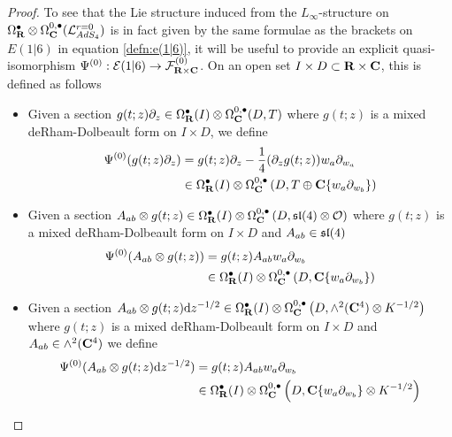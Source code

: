 \documentclass[../main.tex]{subfiles}
\begin{document}
\begin{proof}
To see that the Lie structure induced from the $L_\infty$-structure on $\Omega^\bullet_{\mathbf{R}}\otimes \Omega^{0,\bullet}_{\mathbf{C}} (\mathcal{L}^{r=0}_{AdS_4} )$ is in fact given by the same formulae as the brackets on $E(1|6)$ in equation \ref{defn:e(1|6)}, it will be useful to provide an explicit quasi-isomorphism $\Psi^{(0)} : \mathcal{E}(1|6) \to \mathcal{F}^{(0)}_{\mathbf{R}\times \mathbf{C}}$. On an open set $I\times D\subset \mathbf{R}\times \mathbf{C}$, this is defined as follows

\begin{itemize}
\item Given a section $g(t; z) \partial_z \in \Omega^\bullet_{\mathbf{R}} (I)\otimes \Omega^{0,\bullet}_{\mathbf{C}} (D, T)$ where $g(t;z)$ is a mixed deRham-Dolbeault form on $I \times D$, we define
\begin{align*}
\Psi^{(0)} (g(t;z)\partial_z) &= g(t;z)\partial_z - \frac 14 (\partial_z g(t; z)) w_a\partial_{w_a} \\
&\in \Omega^\bullet_{\mathbf{R}} (I) \otimes \Omega^{0,\bullet}_{\mathbf{C}} \left ( D, T \oplus \mathbf{C}\{w_a\partial _{w_b} \} \right )
\end{align*}
\item Given a section $A_{ab} \otimes g(t; z) \in \Omega^\bullet_{\mathbf{R}} (I)\otimes \Omega^{0,\bullet}_{\mathbf{C}} \left (D, \mathfrak{sl}(4)\otimes \mathcal{O} \right )$ where $g(t;z)$ is a mixed deRham-Dolbeault form on $I \times D$ and $A_{ab}\in \mathfrak{sl}(4)$
\begin{align*}
\Psi^{(0)} (A_{ab} \otimes g(t;z)) &= g(t;z)A_{ab}w_a\partial_{w_b} \\
&\in \Omega^\bullet_{\mathbf{R}} (I) \otimes \Omega^{0,\bullet}_{\mathbf{C}} \left ( D, \mathbf{C}\{w_a\partial _{w_b}\} \right )
\end{align*}

\item Given a section $A_{ab} \otimes g(t; z)\mathrm{d} z^{-1/2} \in \Omega^\bullet_{\mathbf{R}} (I)\otimes \Omega^{0,\bullet}_{\mathbf{C}} \left (D, \wedge^2 (\mathbf{C}^4) \otimes K^{-1/2}\right )$
where $g(t;z)$ is a mixed deRham-Dolbeault form on $I\times D$ and $A_{ab} \in \wedge^2 (\mathbf{C}^4)$ we define
\begin{align*}
\Psi^{(0)} (A_{ab} \otimes g(t; z)\mathrm{d} z^{-1/2}) &= g(t;z)  A_{ab} w_a \partial_{w_b} \\
&\in \Omega^\bullet_{\mathbf{R}} (I) \otimes \Omega^{0,\bullet}_{\mathbf{C}} \left ( D, \mathbf{C}\{w_a\partial _{w_b} \}\otimes K^{-1/2} \right )
\end{align*}



\end{itemize}
\end{proof}
\end{document}
